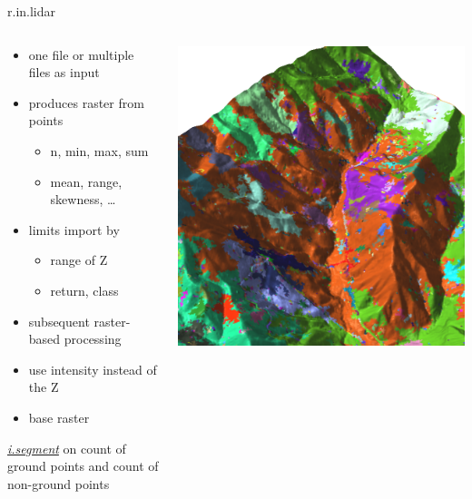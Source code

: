 \documentclass[xcolor={dvipsnames,usenames},beamer,aspectratio=169]{beamer}
\newcommand{\gmodule}[1]{\href{http://grass.osgeo.org/grass71/manuals/#1.html}{\emph{#1}}}
\begin{document}
\begin{frame}{r.in.lidar}

\begin{columns}
\begin{column}{0.4\textwidth}


\begin{itemize}
  \item one file or multiple files as input
  \item produces raster from points
  \begin{itemize}
    \item n, min, max, sum
    \item mean, range, skewness, \ldots
  \end{itemize}
  \item limits import by
  \begin{itemize}
    \item range of Z
    \item return, class
  \end{itemize}
  \item subsequent raster-based processing
  \item use intensity instead of the Z
  \item base raster
\end{itemize}

\begin{flushright}
\footnotesize
\gmodule{i.segment} on count of ground points and count of non-ground points
\end{flushright}

\end{column}
\begin{column}{0.45\textwidth}

\begin{center}
  \includegraphics[width=\textwidth]{grass/segment_on_counts}
\end{center}


\end{column}
\end{columns}
\end{frame}
\end{document}
